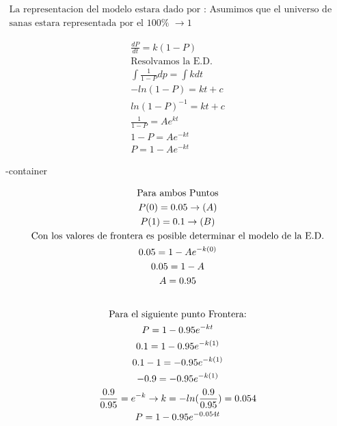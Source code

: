 \documentclass{article}
\begin{document}
\begin{gather*}
\text{La representacion del modelo estara dado por : Asumimos que el universo de personas } \\
\text{sanas estara representada por el 100%
\end{gather*}





\begin{gather*}
\frac{dP}{dt} = k(1-P) \\
\text{Resolvamos la E.D.} \\
\int \frac{1}{1-P}dp = \int kdt \\
-ln(1-P) = kt+c \\
ln(1-P)^{-1} = kt+c \\
\frac{1}{1-P}=Ae^{kt} \\
1-P=Ae^{-kt} \\
P=1-Ae^{-kt}
\end{gather*}




\image-container




\begin{gather*}
\text{Para ambos Puntos} \\
 P(0) = 0.05   \rightarrow (A) \\
P(1) = 0.1  \rightarrow  ( B) \\
\text{Con los valores de frontera es posible determinar el modelo de la E.D.} \\
0.05=1-Ae^{-k(0)} \\
0.05=1-A \\
A=0.95 \\
\vspace{0.5em} \\
\text{Para el siguiente punto Frontera:} \\
P=1-0.95e^{-kt} \\
0.1=1-0.95e^{-k(1)} \\
0.1-1=-0.95e^{-k(1)} \\
-0.9=-0.95e^{-k(1)} \\
\frac{0.9}{0.95} =e^{-k}  \rightarrow k=-ln(\frac{0.9}{0.95} )=0.054 \\
P=1-0.95e^{-0.054t}
\end{gather*}
\end{document}
